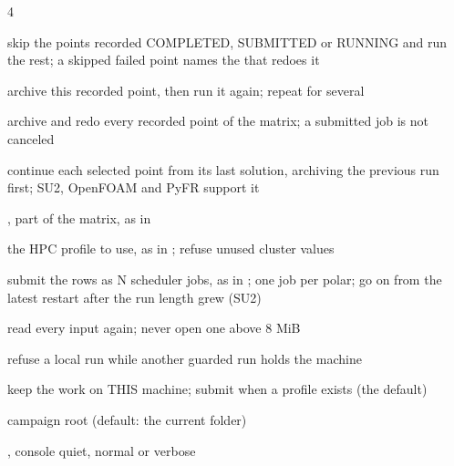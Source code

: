 \begin{multicols}{4}
\begin{flags}
\item {} skip the points recorded COMPLETED, SUBMITTED or RUNNING and run the rest; a skipped failed point names the  that redoes it
\item {} archive this recorded point, then run it again; repeat for several
\item {} archive and redo every recorded point of the matrix; a submitted job is not canceled
\item {} continue each selected point from its last solution, archiving the previous run first; SU2, OpenFOAM and PyFR support it
\item {},  part of the matrix, as in 
\item {} the HPC profile to use, as in ;  refuse unused cluster values
\item {} submit the rows as N scheduler jobs, as in ;  one job per polar;  go on from the latest restart after the run length grew (SU2)
\item {} read every input again;  never open one above 8 MiB
\item {} refuse a local run while another guarded run holds the machine
\item {} keep the work on THIS machine;  submit when a profile exists (the default)
\item {} campaign root (default: the current folder)
\item {},  console quiet, normal or verbose
\end{flags}


\end{multicols}
